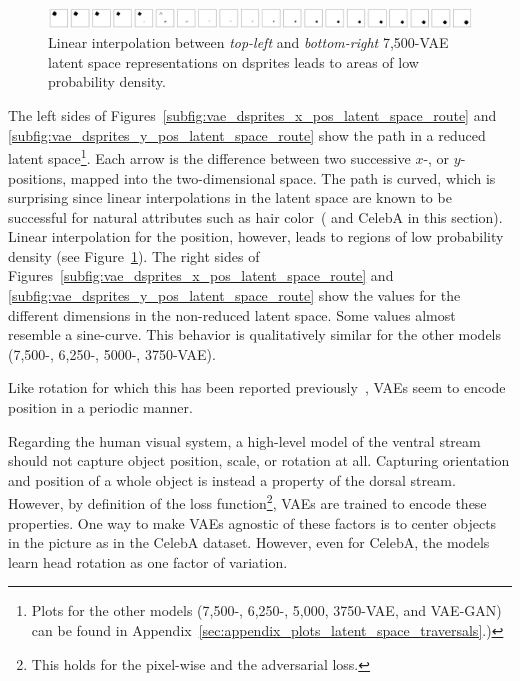 \begin{figure}
    \centering
    \includegraphics[width=\textwidth]{images/latent_space_traversals/vae_dsprites_7500_position.png}
    \caption{Linear interpolation between \textit{top-left} and \textit{bottom-right} 7,500-VAE latent space representations on dsprites leads to areas of low probability density.}
    \label{fig:vae_7500_dsprites_position_interpolation}
\end{figure}

The left sides of Figures~\ref{subfig:vae_dsprites_x_pos_latent_space_route} and \ref{subfig:vae_dsprites_y_pos_latent_space_route} show the path in a reduced latent space\footnote{Plots for the other models (7,500-, 6,250-, 5,000, 3750-\ac{VAE}, and \ac{VAE}-\ac{GAN}) can be found in Appendix~\ref{sec:appendix_plots_latent_space_traversals}.)}.
Each arrow is the difference between two successive $x$-, or $y$-positions, mapped into the two-dimensional space.
The path is curved, which is surprising since linear interpolations in the latent space are known to be successful for natural attributes such as hair color~(\citep{radford2016deep} and CelebA in this section).
Linear interpolation for the position, however, leads to regions of low probability density (see Figure~\ref{fig:vae_7500_dsprites_position_interpolation}).
The right sides of Figures~\ref{subfig:vae_dsprites_x_pos_latent_space_route} and \ref{subfig:vae_dsprites_y_pos_latent_space_route} show the values for the different dimensions in the non-reduced latent space.
Some values almost resemble a sine-curve.
This behavior is qualitatively similar for the other models (7,500-, 6,250-, 5000-, 3750-\ac{VAE}).

Like rotation for which this has been reported previously~\citep{chen2018isolating}, \acp{VAE} seem to encode position in a periodic manner.

Regarding the human visual system, a high-level model of the ventral stream should not capture object position, scale, or rotation at all.
Capturing orientation and position of a whole object is instead a property of the dorsal stream.
However, by definition of the loss function\footnote{This holds for the pixel-wise and the adversarial loss.}, \acp{VAE} are trained to encode these properties.
One way to make \acp{VAE} agnostic of these factors is to center objects in the picture as in the CelebA dataset.
However, even for CelebA, the models learn head rotation as one factor of variation.

